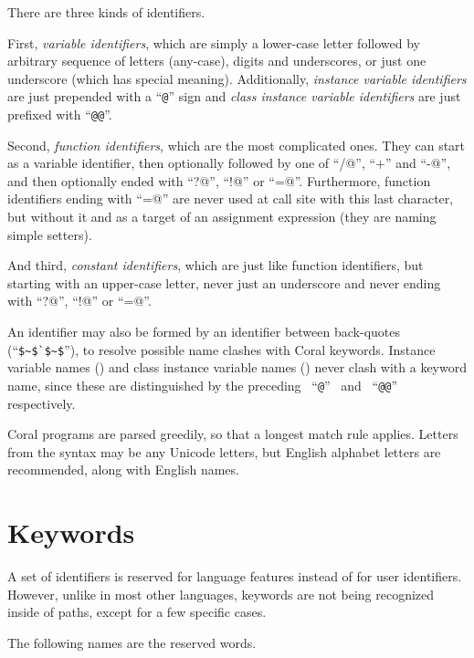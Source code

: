 There are three kinds of identifiers.

First, \textit{variable identifiers}, which are simply a lower-case letter followed by arbitrary sequence of letters (any-case), digits and underscores, or just one underscore (which has special meaning). Additionally, \textit{instance variable identifiers} are just prepended with a ``\lstinline|@|'' sign and \textit{class instance variable identifiers} are just prefixed with ``\lstinline|@@|''. 

Second, \textit{function identifiers}, which are the most complicated ones. They can start as a variable identifier, then optionally followed by one of ``\lstinline@/@'', ``+'' and ``\lstinline@-@'', and then optionally ended with ``\lstinline@?@'', ``\lstinline@!@'' or ``\lstinline@=@''. Furthermore, function identifiers ending with ``\lstinline@=@'' are never used at call site with this last character, but without it and as a target of an assignment expression (they are naming simple setters). 

And third, \textit{constant identifiers}, which are just like function identifiers, but starting with an upper-case letter, never just an underscore and never ending with ``\lstinline@?@'', ``\lstinline@!@'' or ``\lstinline@=@''.

An identifier may also be formed by an identifier between back-quotes (``\lstinline!$~$`$~$!''), to resolve possible name clashes with Coral keywords. Instance variable names () and class instance variable names () never clash with a keyword name, since these are distinguished by the preceding ~``\lstinline!@!''~ and ~``\lstinline!@@!''~ respectively. 

Coral programs are parsed greedily, so that a longest match rule applies. Letters from the syntax may be any Unicode letters, but English alphabet letters are recommended, along with English names.

\section{Keywords}\label{sec:keywords}

A set of identifiers is reserved for language features instead of for user identifiers. However, unlike in most other languages, keywords are not being recognized inside of paths, except for a few specific cases.

The following names are the reserved words.

